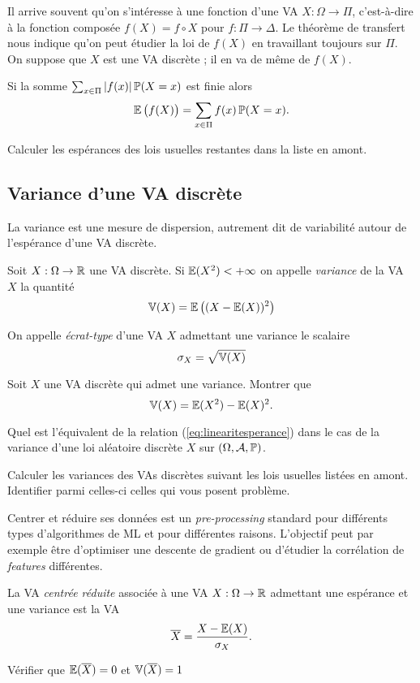 \documentclass[11pt, a4paper]{article}
\begin{document}
Il arrive souvent qu'on s'intéresse à une fonction d'une VA
$X : \Omega \to \Pi$, c'est-à-dire à la fonction composée
$f(X) = f\circ X$ pour $f : \Pi \to \Delta$. Le théorème de transfert
nous indique qu'on peut étudier la loi de $f(X)$ en travaillant
toujours sur $\Pi$. On suppose que $X$ est une VA discrète ; il en va
de même de $f(X)$.
\begin{thm}
  Si la somme $\sum_{x \in \Pi}|f(x)|\operatorname{\mathbb{P}}(X = x)$ est finie alors
  \[
    \operatorname{\mathbb{E}}\big(f(X)\big) = \sum_{x \in \Pi}f(x)\operatorname{\mathbb{P}}(X = x).
  \]
\end{thm}
\begin{question}
  Calculer les espérances des lois usuelles restantes dans la liste en
  amont.
\end{question}

\subsection{Variance d'une VA discrète}
\label{sec:varianceVAdiscrete}

La variance est une mesure de dispersion, autrement dit de variabilité
autour de l'espérance d'une VA discrète.
\begin{defn}
  Soit $X : \Omega \to \mathbb{R}$ une VA discrète. Si $\operatorname{\mathbb{E}}(X^2) < + \infty$
  on appelle \emph{variance} de la VA $X$ la quantité
  \[
    \operatorname{\mathbb{V}}(X) = \operatorname{\mathbb{E}}\big( (X- \operatorname{\mathbb{E}}(X))^2\big)
  \]
\end{defn}
On appelle \emph{écrat-type} d'une VA $X$ admettant une variance le
scalaire
\[
  \sigma_X = \sqrt{\operatorname{\mathbb{V}}(X)}
\]
\begin{question}
  Soit $X$ une VA discrète qui admet une variance. Montrer que
  \[
    \operatorname{\mathbb{V}}(X) = \operatorname{\mathbb{E}}(X^2) - \operatorname{\mathbb{E}}(X)^2.
  \]
\end{question}
\begin{question}
  Quel est l'équivalent de la relation (\ref{eq:linearitesperance})
  dans le cas de la variance d'une loi aléatoire discrète $X$ sur
  $(\Omega, \mathcal{A}, \operatorname{\mathbb{P}})$.
\end{question}
\begin{question}
  Calculer les variances des VAs discrètes suivant les lois usuelles
  listées en amont. Identifier parmi celles-ci celles qui vous posent
  problème.
\end{question}
Centrer et réduire ses données est un \textit{pre-processing} standard
pour différents types d'algorithmes de ML et pour différentes
raisons. L'objectif peut par exemple être d'optimiser une descente de
gradient ou d'étudier la corrélation de \textit{features} différentes.
\begin{defn}
  La VA \emph{centrée réduite} associée à une VA $X : \Omega \to \mathbb{R}$
  admettant une espérance et une variance est la VA
  \[
    \overline{X} = \frac{X - \operatorname{\mathbb{E}}(X)}{\sigma_X}.
  \]
\end{defn}
\begin{question}
  Vérifier que $\operatorname{\mathbb{E}}(\overline{X}) = 0$ et $\operatorname{\mathbb{V}}(\overline{X}) = 1$
\end{question}
\end{document}
